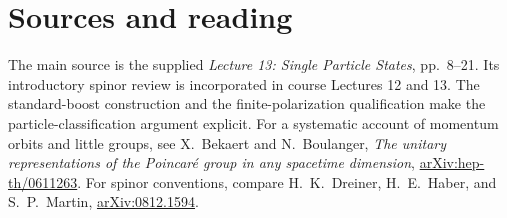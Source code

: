 \documentclass[11pt]{article}
\begin{document}
\section*{Sources and reading}
The main source is the supplied \emph{Lecture 13: Single Particle
States}, pp.\ 8--21. Its introductory spinor review is incorporated
in course Lectures 12 and 13. The standard-boost construction and the
finite-polarization qualification make the particle-classification
argument explicit. For a systematic account of momentum orbits and
little groups, see X.~Bekaert and N.~Boulanger,
\emph{The unitary representations of the Poincar\'e group in any
spacetime dimension},
\href{https://arxiv.org/abs/hep-th/0611263}{arXiv:hep-th/0611263}.
For spinor conventions, compare H.~K.~Dreiner, H.~E.~Haber, and
S.~P.~Martin, \href{https://arxiv.org/abs/0812.1594}{arXiv:0812.1594}.
\end{document}
